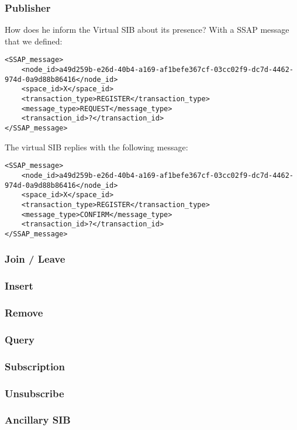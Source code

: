\documentclass[10pt]{beamer}
\begin{document}
\begin{frame}[fragile]
\frametitle{Publisher}

How does he inform the Virtual SIB about its presence? With a SSAP
message that we defined:

\begin{center}
\scriptsize
\begin{verbatim}
<SSAP_message>
	<node_id>a49d259b-e26d-40b4-a169-af1befe367cf-03cc02f9-dc7d-4462-974d-0a9d88b86416</node_id>
	<space_id>X</space_id>
	<transaction_type>REGISTER</transaction_type>
	<message_type>REQUEST</message_type>
	<transaction_id>?</transaction_id>
</SSAP_message>
\end{verbatim}
\end{center}

The virtual SIB replies with the following message:

\begin{center}
\scriptsize
\begin{verbatim}
<SSAP_message>
	<node_id>a49d259b-e26d-40b4-a169-af1befe367cf-03cc02f9-dc7d-4462-974d-0a9d88b86416</node_id>
	<space_id>X</space_id>
	<transaction_type>REGISTER</transaction_type>
	<message_type>CONFIRM</message_type>
	<transaction_id>?</transaction_id>
</SSAP_message>
\end{verbatim}
\end{center}

\end{frame}

\begin{frame}
\frametitle{Join / Leave}
\end{frame}

\begin{frame}
\frametitle{Insert}
\end{frame}

\begin{frame}
\frametitle{Remove}
\end{frame}

\begin{frame}
\frametitle{Query}
\end{frame}

\begin{frame}
\frametitle{Subscription}
\end{frame}

\begin{frame}
\frametitle{Unsubscribe}
\end{frame}

\begin{frame}
\frametitle{Ancillary SIB}
\end{frame}
\end{document}
